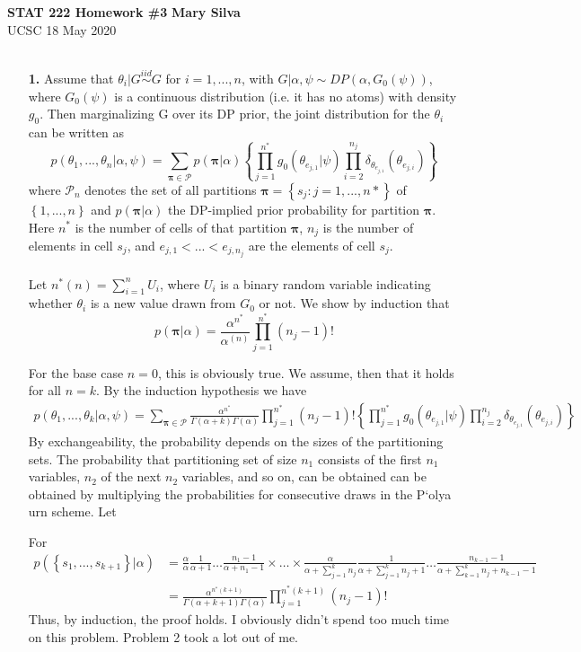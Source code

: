 \documentclass[a4paper, 10pt]{article}
\newcommand{\nstar}{n^*}
\newcommand{\thi}{\theta_i}
\newcommand{\iid}{\stackrel{iid}{\sim}}
\newcommand{\curlies}[1]{ \left\{#1\right\} }
\newcommand{\Gpsi}{G_0(\psi)}
\newcommand{\paramSeq}[2]{#1_1,...,#1_{#2}}
\newcommand{\boldpi}{\pmb{\pi}}
\newcommand{\fancyP}{\mathcal{P}}
\newcommand{\thetEJ}[1]{\theta_{e_{j,#1}}}
\newcommand{\elementEJ}[1]{e_{j,#1}}
\begin{document}
\noindent
\textbf{STAT 222 Homework \#3} \hfill \textbf{Mary Silva}\\
UCSC \hfill  18 May 2020\\
\\
\begin{enumerate}
    \item[\textbf{1.}] Assume that $\thi | G \iid G$ for $i = 1,...,n$, with $G|\alpha, \psi \sim DP(\alpha, \Gpsi)$, where $\Gpsi$ is a continuous distribution (i.e. it has no atoms) with density $g_0$. Then marginalizing G over its DP prior, the joint distribution for the $\thi$ can be written as 
    $$p(\paramSeq{\theta}{n}|\alpha,\psi) = \sum_{\boldpi \in \fancyP} p (\boldpi|\alpha) \curlies{\prod_{j=1}^{n^*} g_0(\thetEJ{1}| \psi) \prod_{i=2}^{n_j} \delta_{\thetEJ{1}}(\thetEJ{i}) } $$
    where $\fancyP_n$ denotes the set of all partitions $\boldpi = \curlies{s_j:j=1,...,n*}$ of $\curlies{1,...,n}$ and $p(\boldpi|\alpha)$  the DP-implied prior probability for partition $\boldpi$. Here $n^*$ is the number of cells of that partition $\boldpi$, $n_j$ is the number of elements in cell $s_j$, and $\elementEJ{1} < ... < \elementEJ{n_j}$ are the elements of cell $s_j$. \\\\
    Let $\nstar(n) = \sum_{i=1}^{n} U_i$, where $U_i$ is a binary random variable indicating whether $\thi$ is a new value drawn from $G_0$ or not. We show by induction that 
    $$p(\boldpi|\alpha) = \frac{\alpha^{n^*}}{\alpha^{(n)}} \prod_{j=1}^{n^*} (n_j - 1)!$$
    
    For the base case $n=0$, this is obviously true. We assume, then that it holds for all $n=k$. 
    By the induction hypothesis we have 
    \begin{align*}
    p(\paramSeq{\theta}{k}|\alpha,\psi) = \sum_{\boldpi\in\fancyP} \frac{\alpha^\nstar}{\Gamma(\alpha+k) \Gamma(\alpha)} \prod_{j=1}^{\nstar} (n_j -1)! \curlies{\prod_{j=1}^{n^*} g_0(\thetEJ{1}| \psi) \prod_{i=2}^{n_j} \delta_{\thetEJ{1}}(\thetEJ{i}) }
    \end{align*}
    By exchangeability, the probability depends on the sizes of the partitioning sets. The probability that partitioning set of size $n_1$ consists of the first $n_1$ variables, $n_2$ of the next $n_2$ variables, and so on, can be obtained can be obtained by multiplying the probabilities for consecutive draws in the P`olya urn scheme. Let 
    
    For 
    \begin{align*}
        p(\curlies{s_1,...,s_{k+1}}| \alpha) &= \frac{\alpha}{\alpha}\frac{1}{\alpha+1} \ldots 
        \frac{n_1 -1}{\alpha + n_1 -1} \times \ldots \times 
        \frac{\alpha}{\alpha + \sum_{j = 1}^k n_j} \frac{1}{\alpha + \sum_{j = 1}^k n_j + 1} \ldots 
        \frac{n_{k-1}-1}{\alpha + \sum_{k=1}^{k} n_j + n_{k-1} -1 }\\
        & = \displaystyle\frac{\alpha^{\nstar(k+1)}}{\Gamma(\alpha + k + 1) \Gamma(\alpha)} \prod_{j=1}^{\nstar(k+1)} (n_j - 1)!
    \end{align*}
    Thus, by induction, the proof holds. I obviously didn't spend too much time on this problem. Problem 2 took a lot out of me.
    

\end{enumerate}
\end{document}
